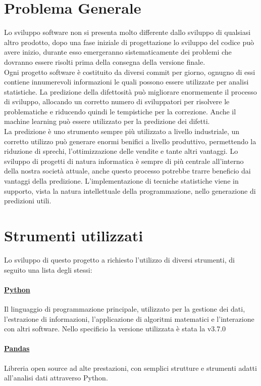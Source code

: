\documentclass[%
    corpo=12pt,
    twoside,
    oldstyle,
    autoretitolo,
    greek,
    evenboxes,
]{toptesi}
\begin{document}
\section{Problema Generale}
Lo sviluppo software non si presenta molto differente dallo sviluppo di qualsiasi altro prodotto, dopo una fase iniziale di progettazione lo sviluppo del codice può avere inizio, durante esso emergeranno sistematicamente dei problemi che dovranno essere risolti prima della consegna della versione finale.\\
Ogni progetto software è costituito da diversi commit per giorno, ognugno di essi contiene innumerevoli informazioni le quali possono essere utilizzate per analisi statistiche. La predizione della difettosità può migliorare enormemente il processo di sviluppo, allocando un corretto numero di sviluppatori per risolvere le problematiche e riducendo quindi le tempistiche per la correzione. Anche il machine learning può essere utilizzato per la predizione dei difetti.\\
La predizione è uno strumento sempre più utilizzato a livello industriale, un corretto utilizzo può generare enormi benifici a livello produttivo, permettendo la riduzione di sprechi, l'ottimizzazione delle vendite e tante altri vantaggi. Lo sviluppo di progetti di natura informatica è sempre di più centrale all'interno della nostra società attuale, anche questo processo potrebbe trarre beneficio dai vantaggi della predizione. L'implementazione di tecniche statistiche viene in supporto, vista la natura intellettuale della programmazione, nello generazione di predizioni utili.

\section{Strumenti utilizzati}
Lo sviluppo di questo progetto a richiesto l'utilizzo di diversi strumenti, di seguito una lista degli stessi:

\paragraph{\href{https://www.python.org/}{Python}} Il linguaggio di programmazione principale, utilizzato per la gestione dei dati, l'estrazione di informazioni, l'applicazione di algoritmi matematici e l'interazione con altri software. Nello specificio la versione utilizzata è stata la v3.7.0

\paragraph{\href{https://pandas.pydata.org/}{Pandas}} Libreria open source ad alte prestazioni, con semplici strutture e strumenti adatti all'analisi dati attraverso Python.
\end{document}
